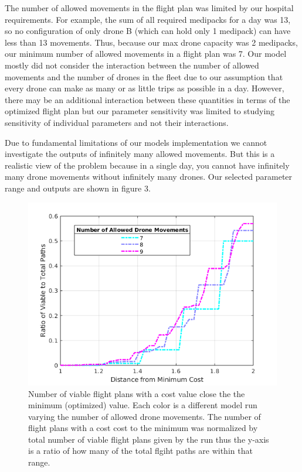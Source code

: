 \documentclass[twocolumn,10pt]{asme2ej}
\begin{document}
The number of allowed movements in the flight plan was limited by our hospital requirements. For example, the sum of all required medipacks for a day was 13, so no configuration of only drone B (which can hold only 1 medipack) can have less than 13 movements. Thus, because our max drone capacity was 2 medipacks, our minimum number of allowed movements in a flight plan was 7. Our model mostly did not consider the interaction between the number of allowed movements and the number of drones in the fleet due to our assumption that every drone can make as many or as little trips as possible in a day. However, there may be an additional interaction between these quantities in terms of the optimized flight plan but our parameter sensitivity was limited to studying sensitivity of individual parameters and not their interactions.

Due to fundamental limitations of our models implementation we cannot investigate the outputs of infinitely many allowed movements. But this is a realistic view of the problem because in a single day, you cannot have infinitely many drone movements without infinitely many drones. Our selected parameter range and outputs are shown in figure 3.
\begin{figure}
	\centering
	\includegraphics[width=0.9\linewidth]{../cobt2d}
	\caption[Fig 3]{Number of viable flight plans with a cost value close the the minimum (optimized) value. Each color is a different model run varying the number of allowed drone movements. The number of flight plans with a cost cost to the minimum was normalized by total number of viable flight plans given by the run thus the y-axis is a ratio of how many of the total flgiht paths are within that range.}
	\label{Fig 3}
\end{figure}
\end{document}
